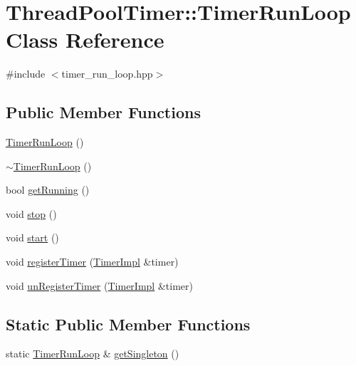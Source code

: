 \hypertarget{classThreadPoolTimer_1_1TimerRunLoop}{\section{Thread\-Pool\-Timer\-:\-:Timer\-Run\-Loop Class Reference}
\label{classThreadPoolTimer_1_1TimerRunLoop}
}


{\ttfamily \#include $<$timer\-\_\-run\-\_\-loop.\-hpp$>$}

\subsection*{Public Member Functions}
\begin{DoxyCompactItemize}
\item 
\hyperlink{classThreadPoolTimer_1_1TimerRunLoop_a2c148c9d8d43304c9f5ce73cb3b8a929}{Timer\-Run\-Loop} ()
\item 
\hyperlink{classThreadPoolTimer_1_1TimerRunLoop_abbe4f1e81556ffef1d665b505f9a6593}{$\sim$\-Timer\-Run\-Loop} ()
\item 
bool \hyperlink{classThreadPoolTimer_1_1TimerRunLoop_a3010542f1e7d6b191223365e052d50ab}{get\-Running} ()
\item 
void \hyperlink{classThreadPoolTimer_1_1TimerRunLoop_ad021a08b2dd037f90f2228e2b22544db}{stop} ()
\item 
void \hyperlink{classThreadPoolTimer_1_1TimerRunLoop_ae94976ed95afb92b0b47b56e11cb78c7}{start} ()
\item 
void \hyperlink{classThreadPoolTimer_1_1TimerRunLoop_a84fe2cd1cbfed86d3f6c2b4dc9f785c3}{register\-Timer} (\hyperlink{classThreadPoolTimer_1_1TimerImpl}{Timer\-Impl} \&timer)
\item 
void \hyperlink{classThreadPoolTimer_1_1TimerRunLoop_a35978d0ef8e0d91808ebfa09da5c24f2}{un\-Register\-Timer} (\hyperlink{classThreadPoolTimer_1_1TimerImpl}{Timer\-Impl} \&timer)
\end{DoxyCompactItemize}
\subsection*{Static Public Member Functions}
\begin{DoxyCompactItemize}
\item 
static \hyperlink{classThreadPoolTimer_1_1TimerRunLoop}{Timer\-Run\-Loop} \& \hyperlink{classThreadPoolTimer_1_1TimerRunLoop_ad8f4868fb5c754e59a9f4ce150625c5a}{get\-Singleton} ()
\end{DoxyCompactItemize}


